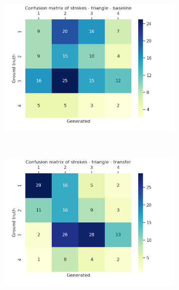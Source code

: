 \begin{figure}[!htbp]
      ~
      \begin{subfigure}[tb]{0.45\textwidth}
          \includegraphics[width=\textwidth]{images/sota/quickdraw_results/quickdraw_triangle_target_strokes_heatmap.png}
      \end{subfigure}
      ~
      \begin{subfigure}[tb]{0.45\textwidth}
          \includegraphics[width=\textwidth]{images/sota/quickdraw_results/quickdraw_triangle_transfer_strokes_heatmap.png}
      \end{subfigure}


\end{figure}
